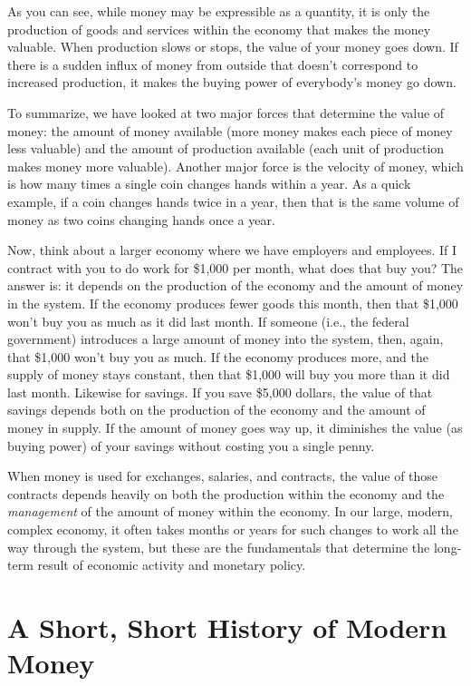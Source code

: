As you can see, while money may be expressible as a quantity, it is only
the production of goods and services within the economy that makes
the money valuable. When production slows or stops, the value of your money
goes down. If there is a sudden influx of money from outside that doesn’t correspond
to increased production, it makes the buying power of everybody’s money go
down. 

To summarize, we have
looked at two major forces that determine the value of money: the
amount of money available (more money makes each piece of money less
valuable) and the amount of production available (each unit of
production makes money more valuable). Another major force is the
velocity of money, which is how many times a single coin changes hands
within a year. As a quick example, if a coin changes hands twice in a year, then that is
the same volume of money as two coins changing hands once a year.

Now, think about a larger economy where we have employers and employees.
If I contract with you to do work for \$1,000 per month, what does that
buy you?  The answer is: it depends on the production of the economy
and the amount of money in the system. If the economy produces fewer
goods this month, then that \$1,000 won’t buy you as much as it did
last month. If someone (i.e., the federal government) introduces a large amount of money into the
system, then, again, that \$1,000 won’t buy you as much. If the economy
produces more, and the supply of money stays constant, then that
\$1,000 will buy you more than it did last month. Likewise for savings.
If you save \$5,000 dollars, the value of that savings depends both on
the production of the economy and the amount of money in supply. If the
amount of money goes way up, it diminishes the value (as buying power)
of your savings without costing you a single penny.

When money is used for exchanges, salaries, and contracts, the value of
those contracts depends heavily on both the production within the
economy and the \textit{management} of the amount of money within the economy. 
In our large, modern, complex economy, it
often takes months or years for such changes to work all the way
through the system, but these are the fundamentals that determine the
long-term result of economic activity and monetary policy.

\section{A Short, Short History of Modern Money}

